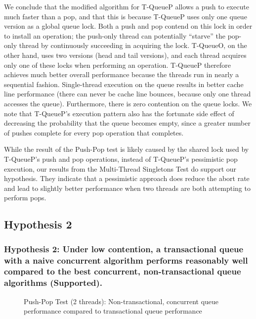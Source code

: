 We conclude that the modified algorithm for T-QueueP allows a push to execute much faster than a pop, and that this is because T-QueueP uses only one queue version as a global queue lock. Both a push and pop contend on this lock in order to install an operation; the push-only thread can potentially ``starve'' the pop-only thread by continuously succeeding in acquiring the lock.
T-QueueO, on the other hand, uses two versions (head and tail versions), and each thread acquires only one of these locks when performing an operation.
T-QueueP therefore achieves much better overall performance because the threads run in nearly a sequential fashion.
Single-thread execution on the queue results in better cache line performance (there can never be cache line bounces, because only one thread accesses the queue). Furthermore, there is zero contention on the queue locks. 
We note that T-QueueP's execution pattern also has the fortunate side effect of decreasing the probability that the queue becomes empty, since a greater number of pushes complete for every pop operation that completes.

While the result of the Push-Pop test is likely caused by the shared lock used by T-QueueP's push and pop operations, instead of T-QueueP's pessimistic pop execution, our results from the Multi-Thread Singletons Test do support our hypothesis. They indicate that a pessimistic approach does reduce the abort rate and lead to slightly better performance when two threads are both attempting to perform pops.

\vspace{12pt}
\noindent{}


\subsection{Hypothesis 2}
\subsubsection{Hypothesis 2: Under low contention, a transactional queue with a naive concurrent algorithm performs reasonably well compared to the best concurrent, non-transactional queue algorithms (Supported).}

\begin{figure}[ht!]
    \centering
	\begin{minipage}{0.75\textwidth}
	\end{minipage}
    \caption{Push-Pop Test (2 threads): Non-transactional, concurrent queue performance compared to transactional queue performance}
    \label{fig:ntqs_pp}
\end{figure}


